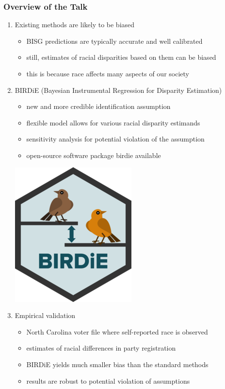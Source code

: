 \documentclass{beamer}
\begin{document}
\begin{frame}

  \frametitle{Overview of the Talk}

  \begin{enumerate}
  \item Existing methods are likely to be biased
    \begin{itemize}
    \item BISG predictions are typically accurate and well calibrated
    \item still, estimates of racial disparities based on them can be biased
    \item this is because race affects many aspects of our society
    \end{itemize}
    \bigskip
  \item \alert{BIRDiE} (Bayesian Instrumental Regression for Disparity
    Estimation) 
    \begin{itemize}
    \item new and more credible identification assumption
    \item flexible model allows for various racial disparity estimands
    \item sensitivity analysis for potential violation of the
      assumption
    \item open-source software package \alert{birdie} available
    \end{itemize}
    \begin{flushright}
      \vspace{-.5in}
      \includegraphics[scale=0.165]{../man/figures/logo.png}
     \end{flushright}
  \item Empirical validation
    \begin{itemize}
    \item North Carolina voter file where self-reported race is
      observed
    \item estimates of racial differences in party registration
    \item BIRDiE yields much smaller bias than the standard methods
    \item results are robust to potential violation of assumptions
    \end{itemize}
  \end{enumerate}

\end{frame}
\end{document}
